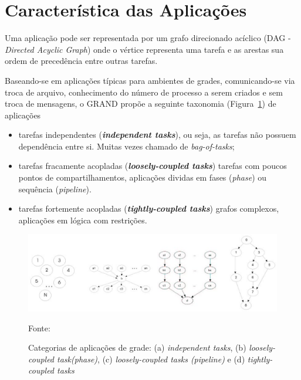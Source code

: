 \section{Característica das Aplicações}

Uma aplicação pode ser representada por um grafo direcionado acíclico (DAG - \emph{Directed Acyclic Graph}) onde o vértice representa uma tarefa e as arestas sua ordem de precedência entre outras tarefas.

Baseando-se em aplicações típicas para ambientes de grades, comunicando-se via troca de arquivo, conhecimento do número de processo a serem criados e sem troca de mensagens, o GRAND propõe a seguinte taxonomia (Figura~\ref{fig:Taxonomia_Aplicacoes}) de aplicações \cite{Vargas2003, Vargas2005, Mangan2006}

\begin{itemize}
	\item tarefas independentes (\emph{\textbf{independent tasks}}), ou seja, as tarefas não possuem dependência entre si. Muitas vezes chamado de \emph{bag-of-tasks};
	\item tarefas fracamente acopladas (\emph{\textbf{loosely-coupled tasks}}) tarefas com poucos pontos de compartilhamentos, aplicações dividas em fases (\emph{phase}) ou sequência (\emph{pipeline}).
	\item tarefas fortemente acopladas (\emph{\textbf{tightly-coupled tasks}}) grafos complexos, aplicações em lógica com restrições.
\end{itemize}

\begin{figure}[htb]
\begin{center}
\includegraphics[scale=0.5]{./img/TaxonomiaAplicacoes.eps}
\caption{Categorias de aplicações de grade: (a) \emph{independent tasks}, (b) \emph{loosely-coupled task(phase)}, (c) \emph{loosely-coupled tasks (pipeline)} e (d) \emph{tightly-coupled tasks}}
\label{fig:Taxonomia_Aplicacoes}
Fonte: \cite{Mangan2006}
\end{center}
\end{figure}

